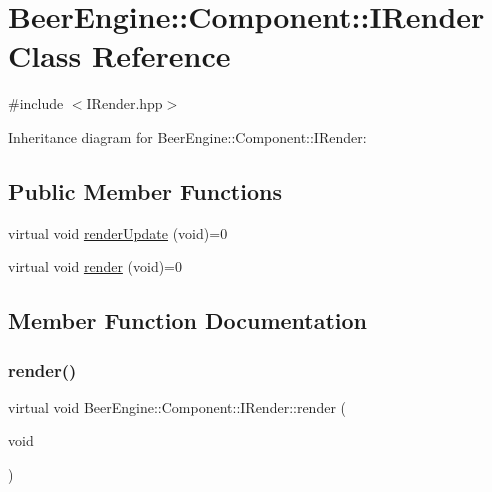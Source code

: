 \hypertarget{class_beer_engine_1_1_component_1_1_i_render}{}\section{Beer\+Engine\+:\+:Component\+:\+:I\+Render Class Reference}
\label{class_beer_engine_1_1_component_1_1_i_render}


{\ttfamily \#include $<$I\+Render.\+hpp$>$}



Inheritance diagram for Beer\+Engine\+:\+:Component\+:\+:I\+Render\+:
\subsection*{Public Member Functions}
\begin{DoxyCompactItemize}
\item 
virtual void \mbox{\hyperlink{class_beer_engine_1_1_component_1_1_i_render_aef1ff4ddcdf216d290c747edd86bd99e}{render\+Update}} (void)=0
\item 
virtual void \mbox{\hyperlink{class_beer_engine_1_1_component_1_1_i_render_a021864acc1288b34b13f8766735ebcc0}{render}} (void)=0
\end{DoxyCompactItemize}


\subsection{Member Function Documentation}
\mbox{\label{class_beer_engine_1_1_component_1_1_i_render_a021864acc1288b34b13f8766735ebcc0}} 
\subsubsection{\texorpdfstring{render()}{render()}}
{\footnotesize\ttfamily virtual void Beer\+Engine\+::\+Component\+::\+I\+Render\+::render (\begin{DoxyParamCaption}\item[{void}]{ }\end{DoxyParamCaption})\hspace{0.3cm}{\ttfamily [pure virtual]}}



